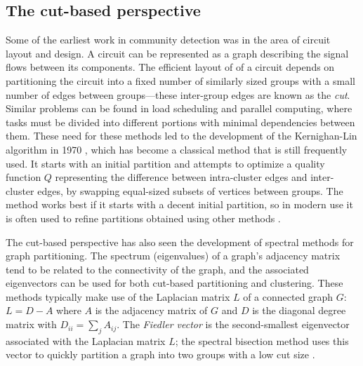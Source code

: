 
\hypertarget{the-cut-based-perspective}{\subsection{The cut-based
perspective}\label{the-cut-based-perspective}}

Some of the earliest work in community detection was in the area of
circuit layout and design. A circuit can be represented as a graph
describing the signal flows between its components. The efficient layout
of of a circuit depends on partitioning the circuit into a fixed number
of similarly sized groups with a small number of edges between
groups---these inter-group edges are known as the \emph{cut}. Similar
problems can be found in load scheduling and parallel computing, where
tasks must be divided into different portions with minimal dependencies
between them. These need for these methods led to the development of the
Kernighan-Lin algorithm in 1970 \autocite{kernighan_efficient_1970},
which has become a classical method that is still frequently used. It
starts with an initial partition and attempts to optimize a quality
function \(Q\) representing the difference between intra-cluster edges
and inter-cluster edges, by swapping equal-sized subsets of vertices
between groups. The method works best if it starts with a decent initial
partition, so in modern use it is often used to refine partitions
obtained using other methods \autocite{fortunato_community_2010}.

The cut-based perspective has also seen the development of spectral
methods for graph partitioning. The spectrum (eigenvalues) of a graph's
adjacency matrix tend to be related to the connectivity of the graph,
and the associated eigenvectors can be used for both cut-based
partitioning and clustering. These methods typically make use of the
Laplacian matrix \(L\) of a connected graph \(G\): \(L = D - A\) where
\(A\) is the adjacency matrix of \(G\) and \(D\) is the diagonal degree
matrix with \(D_{ii} = \sum_{j}{A_{ij}}\). The \emph{Fiedler vector} is
the second-smallest eigenvector associated with the Laplacian matrix
\(L\); the spectral bisection method uses this vector to quickly
partition a graph into two groups with a low cut size
\autocite{fiedler_algebraic_1973}.

